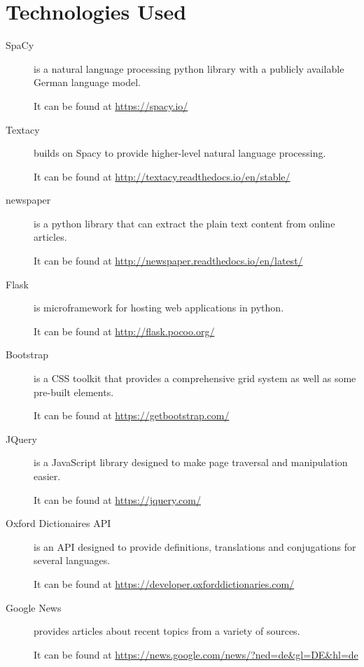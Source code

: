 \chapter{Technologies Used}

\begin{description}
	\item[SpaCy] is a natural language processing python library with a publicly available German language model. 
	
	It can be found at \url{https://spacy.io/}
	
	\item[Textacy] builds on Spacy to provide higher-level natural language processing. 
	
	It can be found at \url{http://textacy.readthedocs.io/en/stable/}
	
	\item[newspaper] is a python library that can extract the plain text content from online articles. 
	
	It can be found at \url{http://newspaper.readthedocs.io/en/latest/}
	
	\item[Flask] is microframework for hosting web applications in python. 
	
	It can be found at \url{http://flask.pocoo.org/}
	
	\item[Bootstrap] is a CSS toolkit that provides a comprehensive grid system as well as some pre-built elements. 
	
	It can be found at \url{https://getbootstrap.com/}
	
	\item[JQuery] is a JavaScript library designed to make page traversal and manipulation easier.
	
	It can be found at \url{https://jquery.com/}
	
	\item[Oxford Dictionaires API] is an API designed to provide definitions, translations and conjugations for several languages. 
	
	It can be found at \url{https://developer.oxforddictionaries.com/}
	
	\item[Google News] provides articles about recent topics from a variety of sources. 
	
	It can be found at \url{https://news.google.com/news/?ned=de\&gl=DE\&hl=de}
\end{description}